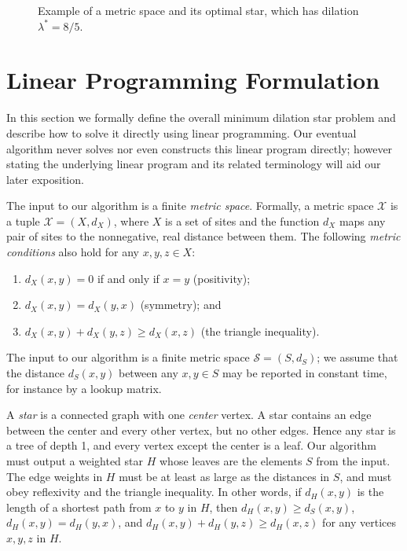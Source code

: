 \documentclass{llncs}
\def \figurescale {.85}
\begin{document}
\begin{figure}
\centering
\scalebox{\figurescale}{\texttt{[image: example.eps]}}
\caption{Example of a metric space and its optimal star, which has dilation $\lambda^*=8/5$.}
\label{figure:example}
\end{figure}

\section{Linear Programming Formulation}
\label{section:linear_program}

In this section we formally define the overall minimum dilation star problem and describe how to solve it directly using linear programming.  Our eventual algorithm never solves nor even constructs this linear program directly; however stating the underlying linear program and its related terminology will aid our later exposition.

The input to our algorithm is a finite \emph{metric space}.  Formally, a metric space $\mathcal{X}$ is a tuple $\mathcal{X}=(X,d_X)$, where $X$ is a set of sites and the function $d_X$ maps any pair of sites to the nonnegative, real distance between them.  The following \emph{metric conditions} also hold for any $x,y,z \in X$:
\begin{enumerate}
\item $d_X(x,y) = 0$ if and only if $x=y$ (positivity);
\item $d_X(x,y) = d_X(y,x)$ (symmetry); and
\item $d_X(x,y) + d_X(y,z) \geq d_X(x,z)$ (the triangle inequality).
\end{enumerate}
\noindent The input to our algorithm is a finite metric space $\mathcal{S}=(S,d_S)$; we assume that the distance $d_S(x,y)$ between any $x,y \in S$ may be reported in constant time, for instance by a lookup matrix.

A \emph{star} is a connected graph with one \emph{center} vertex.  A star contains an edge between the center and every other vertex, but no other edges.  Hence any star is a tree of depth 1, and every vertex except the center is a leaf.  Our algorithm must output a weighted star $H$ whose leaves are the elements $S$ from the input.  The edge weights in $H$ must be at least as large as the distances in $S$, and must obey reflexivity and the triangle inequality.  In other words, if $d_{H}(x,y)$ is the length of a shortest path from $x$ to $y$ in $H$, then $d_{H}(x,y) \geq d_{S}(x,y)$, $d_{H}(x,y) = d_{H}(y,x)$, and $d_{H}(x,y) + d_{H}(y,z) \geq d_{H}(x,z)$ for any vertices $x,y,z$ in $H$.
\end{document}
